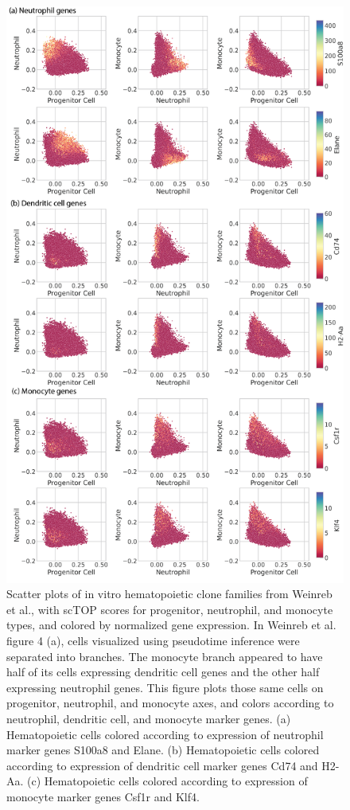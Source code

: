\documentclass[aps,superscriptaddress, notitlepage,longbibliography]{revtex4-1}
\begin{document}
\begin{figure}
	\centering
		\includegraphics[scale=0.72]{figs/hem genes.png}
	\caption{Scatter plots of in vitro hematopoietic clone families from Weinreb et al., with scTOP scores for progenitor, neutrophil, and monocyte types, and colored by normalized gene expression. In Weinreb et al. figure 4 (a), cells visualized using pseudotime inference were separated into branches. The monocyte branch appeared to have half of its cells expressing dendritic cell genes and the other half expressing neutrophil genes. This figure plots those same cells on progenitor, neutrophil, and monocyte axes, and colors according to neutrophil, dendritic cell, and monocyte marker genes. (a) Hematopoietic cells colored according to expression of neutrophil marker genes S100a8 and Elane. (b) Hematopoietic cells colored according to expression of dendritic cell marker genes Cd74 and H2-Aa. (c) Hematopoietic cells colored according to expression of monocyte marker genes Csf1r and Klf4. }
	\label{hem genes}
\end{figure}
\end{document}
